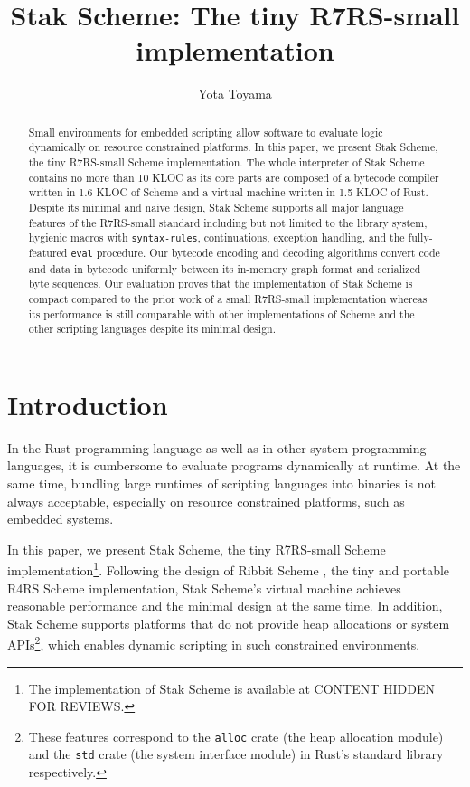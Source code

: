 \documentclass[sigplan, anonymous, review]{acmart}
\newcommand{\draft}[1]{CONTENT HIDDEN FOR REVIEWS}
\begin{document}
\title{Stak Scheme: The tiny R7RS-small implementation}
\author{Yota Toyama}

\begin{abstract}
  Small environments for embedded scripting allow software to
  evaluate logic dynamically on resource constrained platforms.
  In this paper, we present Stak Scheme, the tiny R7RS-small
  Scheme implementation.
  The whole interpreter of Stak Scheme contains no more than 10 KLOC as
  its core parts are composed of a bytecode compiler written in 1.6 KLOC
  of Scheme and a virtual machine written in 1.5 KLOC of Rust.
  Despite its minimal and naive design, Stak Scheme
  supports all major language features of the R7RS-small standard including
  but not limited to the library system, hygienic macros with
  \texttt{syntax-rules}, continuations, exception handling, and the
  fully-featured \texttt{eval} procedure.
  Our bytecode encoding and decoding algorithms convert code and
  data in bytecode uniformly
  between its in-memory graph format and serialized byte sequences.
  Our evaluation proves that the implementation of Stak Scheme is
  compact compared to the prior work of a small R7RS-small implementation
  whereas its performance is still
  comparable with other implementations of Scheme and the other
  scripting languages despite its minimal design.
\end{abstract}

\maketitle

\section{Introduction}

In the Rust programming language as well as in other system
programming languages, it is cumbersome to evaluate programs
dynamically at runtime. At the same time, bundling large runtimes of
scripting languages into binaries is not always acceptable,
especially on resource constrained platforms, such as embedded systems.

In this paper, we present Stak Scheme, the tiny R7RS-small Scheme
implementation\footnote{
  The implementation of Stak Scheme is available at
  \draft{\url{https://github.com/raviqqe/stak}}.
}.
Following the design of Ribbit Scheme
\cite{ribbit2023}, the tiny and
portable R4RS Scheme implementation, Stak Scheme's virtual machine
achieves reasonable performance and the minimal design
at the same time.
In addition, Stak Scheme supports platforms that do not provide
heap allocations or system APIs\footnote{
  These features correspond to the \texttt{alloc}
  crate (the heap allocation module) and the \texttt{std} crate (the
  system interface module) in Rust's standard library respectively.
}, which enables dynamic scripting in such constrained environments.
\end{document}
